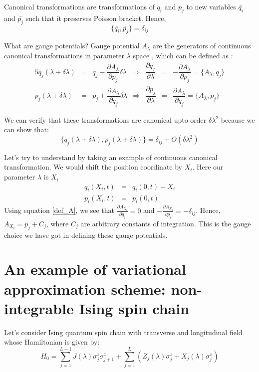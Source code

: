 \documentclass[11pt,a4paper]{article}
\begin{document}
Canonical transformations are transformations of $q_i$ and $p_j$ to new variables $\bar{q_i}$ and $\bar{p_j}$ such that it preserves Poisson bracket. Hence, 
\begin{equation}
\{\bar{q_i},\bar{p_j} \}=\delta_{ij} 
\end{equation}

What are gauge potentials? Gauge potential $A_{\lambda}$  are the generators of continuous canonical transformations in parameter $\lambda$ space , which can be defined as :
\begin{alignat}{5}
q_j(\lambda + \delta \lambda) & =& q_j - \dfrac{\partial A_{\lambda}}{\partial p_j} \delta \lambda &\Rightarrow & \dfrac{\partial q_j}{\partial \lambda} &=& -\dfrac{\partial A_{\lambda}}{\partial p_j} = \{A_{\lambda},q_j \} \\
p_j(\lambda + \delta \lambda) & =& p_j + \dfrac{\partial A_{\lambda}}{\partial q_j} \delta \lambda & \Rightarrow & \dfrac{\partial p_j}{\partial \lambda} &=& \dfrac{\partial A_{\lambda}}{\partial q_j}=\{ A_{\lambda},p_j \}
\label{def_A}
\end{alignat}

We can verify that these transformations are canonical upto order $\delta \lambda ^2$ because we can show that:
\begin{equation}
\{q_j(\lambda + \delta \lambda), p_j(\lambda + \delta \lambda)\} = \delta_{ij} + O(\delta \lambda ^2)
\end{equation}

Let's try to understand by taking an example of continuous canonical transformation. We would shift the position coordinate by $X_i$. Here our parameter $\lambda$ is $X_i$
\begin{eqnarray}
 q_i(X_i,t) &=& q_i(0,t) - X_i \\
p_i(X_i,t)&=& p_i(0,t)
\end{eqnarray}
Using equation \ref{def_A}, we see that $\frac{\partial A_{X_i}}{\partial q_j}=0$ and $-\frac{\partial A_{X_i}}{\partial p_j}=-\delta_{ij}$. Hence, $A_{X_i}=p_j + C_j$, where $C_j$ are arbitrary constants of integration. This is the gauge choice we have got in defining these gauge potentials. 

\section{An example of variational approximation scheme: non-integrable Ising spin chain}
Let's consider Ising quantum spin chain with transverse and longitudinal field whose Hamiltonian is given by:
\begin{equation}
H_0=\sum_{j=1}^{L-1} J(\lambda) \sigma_j^z \sigma_{j+1}^z + \sum_{j=1}^{L}  (Z_j (\lambda) \sigma_j^z +X_j (\lambda) \sigma_j^x)
\label{non_integrable_chain}
\end{equation}
\end{document}

